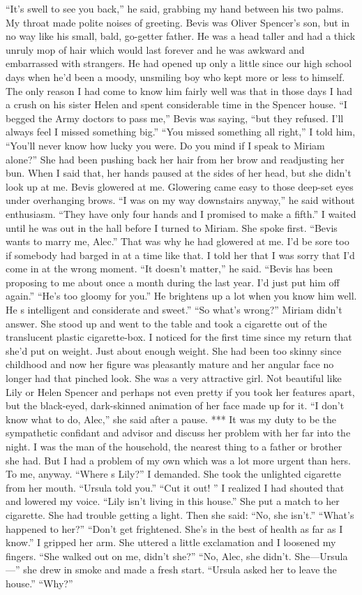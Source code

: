 \documentclass{novel}
\begin{document}
“It’s swell to see you back,” he said, grabbing my hand between his two palms. My throat made polite noises of greeting. Bevis was Oliver Spencer’s son, but in no way like his small, bald, go-getter father. He was a head taller and had a thick unruly mop of hair which would last forever and he was awkward and embarrassed with strangers. He had opened up only a little since our high school days when he’d been a moody, unsmiling boy who kept more or less to himself. The only reason I had come to know him fairly well was that in those days I had a crush on his sister Helen and spent considerable time in the Spencer house. “I begged the Army doctors to pass me,” Bevis was saying, “but they refused. I’ll always feel I missed something big.” “You missed something all right,” I told him, “You’ll never know how lucky you were. Do you mind if I speak to Miriam alone?” She had been pushing back her hair from her brow and readjusting her bun. When I said that, her hands paused at the sides of her head, but she didn’t look up at me. Bevis glowered at me. Glowering came easy to those deep-set eyes under overhanging brows. “I was on my way downstairs anyway,” he said without enthusiasm. “They have only four hands and I promised to make a fifth.” I waited until he was out in the hall before I turned to Miriam. She spoke first. “Bevis wants to marry me, Alec.” That was why he had glowered at me. I’d be sore too if somebody had barged in at a time like that. I told her that I was sorry that I’d come in at the wrong moment. “It doesn’t matter,” he said. “Bevis has been proposing to me about once a month during the last year. I’d just put him off again.” “He’s too gloomy for you.” He brightens up a lot when you know him well. He s intelligent and considerate and sweet.” “So what’s wrong?” Miriam didn’t answer. She stood up and went to the table and took a cigarette out of the translucent plastic cigarette-box. I noticed for the first time since my return that she’d put on weight. Just about enough weight. She had been too skinny since childhood and now her figure was pleasantly mature and her angular face no longer had that pinched look. She was a very attractive girl. Not beautiful like Lily or Helen Spencer and perhaps not even pretty if you took her features apart, but the black-eyed, dark-skinned animation of her face made up for it. “I don’t know what to do, Alec,” she said after a pause. *** It was my duty to be the sympathetic confidant and advisor and discuss her problem with her far into the night. I was the man of the household, the nearest thing to a father or brother she had. But I had a problem of my own which was a lot more urgent than hers. To me, anyway. “Where s Lily?” I demanded. She took the unlighted cigarette from her mouth. “Ursula told you.” “Cut it out! ” I realized I had shouted that and lowered my voice. “Lily isn’t living in this house.” She put a match to her cigarette. She had trouble getting a light. Then she said: “No, she isn’t.” “What’s happened to her?” “Don’t get frightened. She’s in the best of health as far as I know.” I gripped her arm. She uttered a little exclamation and I loosened my fingers. “She walked out on me, didn’t she?” “No, Alec, she didn’t. She—Ursula—” she drew in smoke and made a fresh start. “Ursula asked her to leave the house.” “Why?” 
\end{document}
